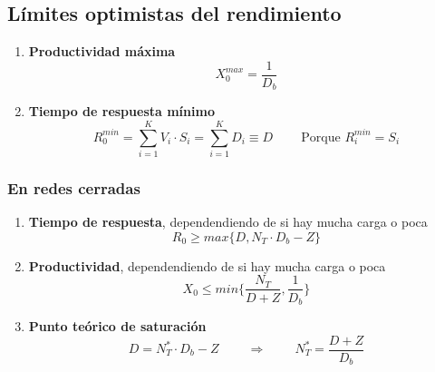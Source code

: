 \documentclass[10pt,spanish, landscape, twocolumn]{article}
\begin{document}
\newpage
\subsection{Límites optimistas del rendimiento}
\begin{enumerate}[$\bullet$]
    \item \textbf{Productividad máxima}
    \begin{displaymath}
        X_0^{max} = \frac{1}{D_b}
    \end{displaymath}

    \item \textbf{Tiempo de respuesta mínimo}
    \begin{displaymath}
        R_0^{min} = \sum_{i=1}^K V_i \cdot S_i = \sum_{i=1}^K D_i \equiv D \qquad\ \textrm{Porque $R_i^{min} = S_i$}
    \end{displaymath}
\end{enumerate}

\subsubsection{En redes cerradas}
\begin{enumerate}[$\bullet$]
    \item \textbf{Tiempo de respuesta}, dependendiendo de si hay mucha carga o poca
    \begin{displaymath}
        R_0 \geq max \{D, N_T \cdot D_b - Z\}
    \end{displaymath}

    \item \textbf{Productividad}, dependendiendo de si hay mucha carga o poca
    \begin{displaymath}
        X_0 \leq min \Bigg \{ \frac{N_T}{D + Z}, \frac{1}{D_b} \Bigg\}
    \end{displaymath}

    \item \textbf{Punto teórico de saturación}
    \begin{displaymath}
        D = N_T^* \cdot D_b - Z \qquad\ \Longrightarrow \qquad\ N_T^* = \frac{D+Z}{D_b}
    \end{displaymath}
\end{enumerate}

\newpage
\end{document}
